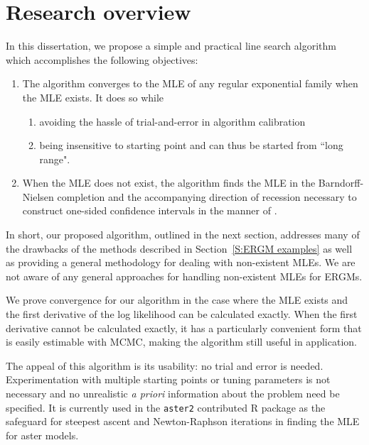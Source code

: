 
\section{Research overview} \label{S:Research overview}
In this dissertation, we propose a simple and practical line search algorithm which
accomplishes the following objectives:
\begin{enumerate}
\item The algorithm converges to the MLE of any regular exponential family 
when the MLE exists.  It does so while
\begin{enumerate}
	\item avoiding the hassle of trial-and-error in algorithm calibration
	\item being insensitive to starting point and can thus be started from ``long range".
\end{enumerate}
\item When the MLE does not exist, the algorithm finds the MLE in the Barndorff-Nielsen completion and the 
accompanying direction of recession necessary to construct one-sided 
confidence intervals in the manner of \citet{Geyer:gdor}.
\end{enumerate}

In short, our proposed algorithm, outlined in the next section,
 addresses many of the drawbacks of the methods
described in Section~\ref{S:ERGM examples} as well as providing a general methodology
for dealing with non-existent MLEs.  We are not aware of any general approaches for
handling non-existent MLEs for ERGMs.  

We prove convergence for our algorithm in the case where the MLE exists and the first 
derivative of the log likelihood can be calculated exactly.
When the first derivative cannot be calculated exactly, 
it has a particularly convenient form that is 
easily estimable with MCMC, making the algorithm still useful in application.

The appeal of this algorithm is its usability: no trial and error is needed.  
Experimentation with multiple starting points or tuning parameters is not necessary 
and no unrealistic \emph{a priori} information about the problem need be specified.  
It is currently used in the \texttt{aster2} contributed R package 
\citep{aster:R} as the safeguard for steepest ascent and Newton-Raphson
 iterations in finding the MLE for aster models.

